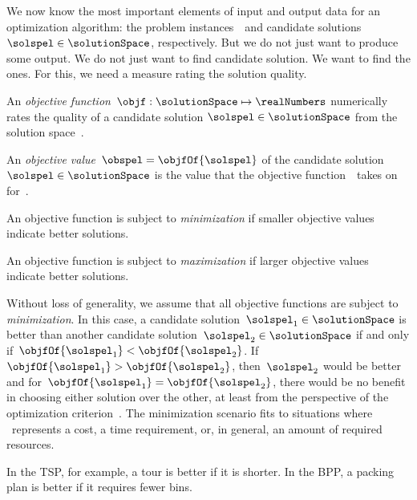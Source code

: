%
\label{sec:objectiveFunction}%
%
We now know the most important elements of input and output data for an optimization algorithm: the problem instances~\instance\ and candidate solutions~$\solspel\in\solutionSpace$, respectively.
But we do not just want to produce some output.
We do not just want to find  candidate solution.
We want to find the  ones.
For this, we need a measure rating the solution quality.%
%
%
%
\begin{definition}%
\label{def:objectiveFunction}%
An \emph{objective function}~$\objf:\solutionSpace\mapsto\realNumbers$ numerically rates the quality of a candidate solution $\solspel\in\solutionSpace$ from the solution space~\solutionSpace.%
\end{definition}%
%
\begin{definition}%
\label{def:objectiveValue}%
An \emph{objective value}~$\obspel=\objfOf{\solspel}$ of the candidate solution~$\solspel\in\solutionSpace$ is the value that the objective function~\objf\ takes on for~\solspel.%
\end{definition}%
%
\begin{definition}[Minimization]%
\label{def:minimization}%
An objective function is subject to \emph{minimization} if smaller objective values indicate better solutions.%
\end{definition}%
%
\begin{definition}[Maximiation]%
\label{def:maximization}%
An objective function is subject to \emph{maximization} if larger objective values indicate better solutions.%
\end{definition}%
%
Without loss of generality, we assume that all objective functions are subject to \emph{minimization}.
In this case, a candidate solution~$\solspel_1\in\solutionSpace$ is better than another candidate solution~$\solspel_2\in\solutionSpace$ if and only if~$\objfOf{\solspel_1}<\objfOf{\solspel_2}$.
If~$\objfOf{\solspel_1}>\objfOf{\solspel_2}$, then~$\solspel_2$ would be better and for~$\objfOf{\solspel_1}=\objfOf{\solspel_2}$, there would be no benefit in choosing either solution over the other, at least from the perspective of the optimization criterion~\objf.
The minimization scenario fits to situations where \objf~represents a cost, a time requirement, or, in general, an amount of required resources.

In the \gls{TSP}, for example, a tour is better if it is shorter.
In the \gls{BPP}, a packing plan is better if it requires fewer bins.

